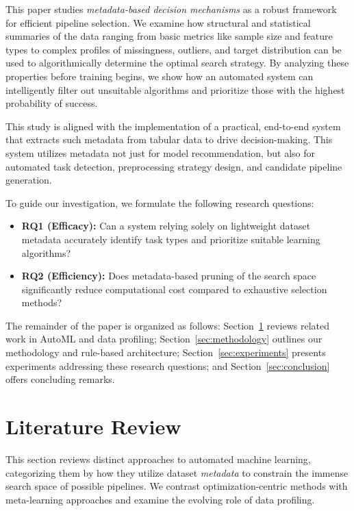 \documentclass[conference]{IEEEtran}
\begin{document}
   This paper studies \emph{metadata-based decision mechanisms} as a robust framework for efficient pipeline selection. We examine how structural and statistical summaries of the data ranging from basic metrics like sample size and feature types to complex profiles of missingness, outliers, and target distribution can be used to algorithmically determine the optimal search strategy. By analyzing these properties before training begins, we show how an automated system can intelligently filter out unsuitable algorithms and prioritize those with the highest probability of success.

   This study is aligned with the implementation of a practical, end-to-end system that extracts such metadata from tabular data to drive decision-making. This system utilizes metadata not just for model recommendation, but also for automated task detection, preprocessing strategy design, and candidate pipeline generation. 
   
   To guide our investigation, we formulate the following research questions:
   \begin{itemize}
       \item \textbf{RQ1 (Efficacy):} Can a system relying solely on lightweight dataset metadata accurately identify task types and prioritize suitable learning algorithms?
       \item \textbf{RQ2 (Efficiency):} Does metadata-based pruning of the search space significantly reduce computational cost compared to exhaustive selection methods?
   \end{itemize}
   
   The remainder of the paper is organized as follows: Section~\ref{sec:literature} reviews related work in AutoML and data profiling; Section~\ref{sec:methodology} outlines our methodology and rule-based architecture; Section~\ref{sec:experiments} presents experiments addressing these research questions; and Section~\ref{sec:conclusion} offers concluding remarks.

   \section{Literature Review}
   \label{sec:literature}

   This section reviews distinct approaches to automated machine learning, categorizing them by how they utilize dataset \emph{metadata} to constrain the immense search space of possible pipelines. We contrast optimization-centric methods with meta-learning approaches and examine the evolving role of data profiling.
\end{document}
